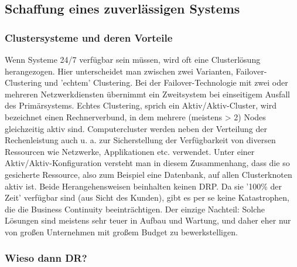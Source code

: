 \documentclass[letterpaper, 12pt]{article}
\let\tempsubsection\subsection
\renewcommand\subsection[1]{\vspace{0cm}\tempsubsection{#1}\vspace{0cm}}
\let\tempsubsubsection\subsubsection
\renewcommand\subsubsection[1]{\vspace{0cm}\tempsubsubsection{#1}\vspace{0cm}}
\begin{document}
\subsection{Schaffung eines zuverlässigen Systems \cite{bookthree}}

\subsubsection{Clustersysteme und deren Vorteile}

Wenn Systeme 24/7 verfügbar sein müssen, wird oft eine Clusterlösung herangezogen. Hier unterscheidet man zwischen zwei Varianten, Failover-Clustering und 'echtem' Clustering. Bei der Failover-Technologie mit zwei oder mehreren Netzwerkdiensten übernimmt ein Zweitsystem bei einseitigem Ausfall des Primärsystems. Echtes Clustering, sprich ein Aktiv/Aktiv-Cluster, wird bezeichnet einen Rechnerverbund, in dem mehrere (meistens > 2) Nodes gleichzeitig aktiv sind. Computercluster werden neben der Verteilung der Rechenleistung auch u. a. zur Sicherstellung der Verfügbarkeit von diversen Ressourcen wie Netzwerke, Applikationen etc. verwendet. Unter einer Aktiv/Aktiv-Konfiguration versteht man in diesem Zusammenhang, dass die so gesicherte Ressource, also zum Beispiel eine Datenbank, auf allen Clusterknoten aktiv ist. Beide Herangehensweisen beinhalten keinen DRP. Da sie '100\% der Zeit' verfügbar sind (aus Sicht des Kunden), gibt es per se keine Katastrophen, die die Business Continuity beeinträchtigen. Der einzige Nachteil: Solche Lösungen sind meistens sehr teuer in Aufbau und Wartung, und daher eher nur von großen Unternehmen mit großem Budget zu bewerkstelligen.

\subsubsection{Wieso dann DR?}
\end{document}
